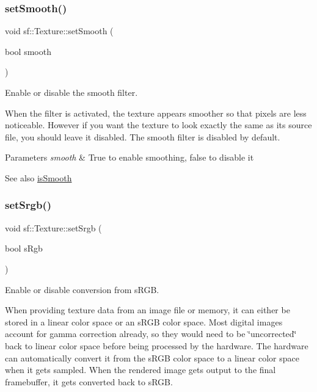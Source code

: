 \subsubsection{\texorpdfstring{set\+Smooth()}{setSmooth()}}
{\footnotesize\ttfamily void sf\+::\+Texture\+::set\+Smooth (\begin{DoxyParamCaption}\item[{bool}]{smooth }\end{DoxyParamCaption})}



Enable or disable the smooth filter. 

When the filter is activated, the texture appears smoother so that pixels are less noticeable. However if you want the texture to look exactly the same as its source file, you should leave it disabled. The smooth filter is disabled by default.


\begin{DoxyParams}{Parameters}
{\em smooth} & True to enable smoothing, false to disable it\\
\hline
\end{DoxyParams}
\begin{DoxySeeAlso}{See also}
\hyperlink{classsf_1_1_texture_a3ebb050b5a71e1d40ba66eb1a060e103}{is\+Smooth} 
\end{DoxySeeAlso}
\mbox{\label{classsf_1_1_texture_af8a38872c50a33ff074bd0865db19dd4}} 
\subsubsection{\texorpdfstring{set\+Srgb()}{setSrgb()}}
{\footnotesize\ttfamily void sf\+::\+Texture\+::set\+Srgb (\begin{DoxyParamCaption}\item[{bool}]{s\+Rgb }\end{DoxyParamCaption})}



Enable or disable conversion from s\+R\+GB. 

When providing texture data from an image file or memory, it can either be stored in a linear color space or an s\+R\+GB color space. Most digital images account for gamma correction already, so they would need to be \char`\"{}uncorrected\char`\"{} back to linear color space before being processed by the hardware. The hardware can automatically convert it from the s\+R\+GB color space to a linear color space when it gets sampled. When the rendered image gets output to the final framebuffer, it gets converted back to s\+R\+GB.

